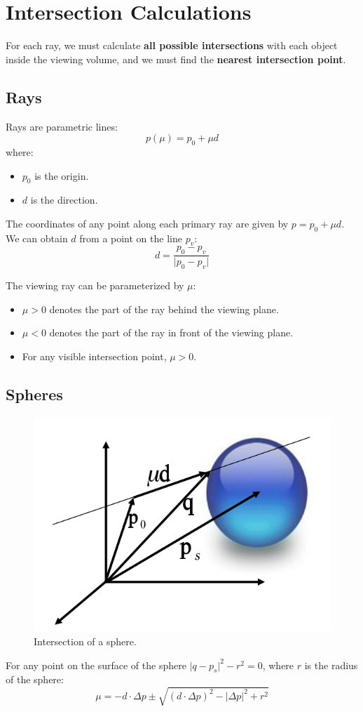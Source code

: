 \documentclass[11pt]{article}
\begin{document}
\section{Intersection Calculations}
For each ray, we must calculate \textbf{all possible intersections} with each object inside the viewing volume, and we must find the \textbf{nearest intersection point}.

\subsection{Rays}
Rays are parametric lines:
\[
  p(\mu) = p_0 + \mu d 
\]
where:
\begin{itemize}
  \item $p_0$ is the origin.
  \item $d$ is the direction.
\end{itemize}

The coordinates of any point along each primary ray are given by $p = p_0 + \mu d$.
We can obtain $d$ from a point on the line $p_v$:
\[
  d = \frac{p_0 - p_v}{\lvert p_0 - p_v \rvert} 
\]

The viewing ray can be parameterized by $\mu$:
\begin{itemize}
  \item $\mu > 0$ denotes the part of the ray behind the viewing plane.
  \item $\mu < 0$ denotes the part of the ray in front of the viewing plane.
  \item For any visible intersection point, $\mu > 0$.
\end{itemize}

\subsection{Spheres}
\begin{figure}[htb!]
  \centering
  \caption{Intersection of a sphere.}
  \includegraphics[scale=0.5]{sphereintersection}
\end{figure}
For any point on the surface of the sphere $\lvert q - p_s \rvert ^2 - r^2 = 0$, where
$r$ is the radius of the sphere:
\[
  \mu = -d \cdot \Delta p \pm \sqrt{(d \cdot \Delta p) ^2 - \lvert \Delta p \rvert ^2 + r^2} 
\]
\end{document}

